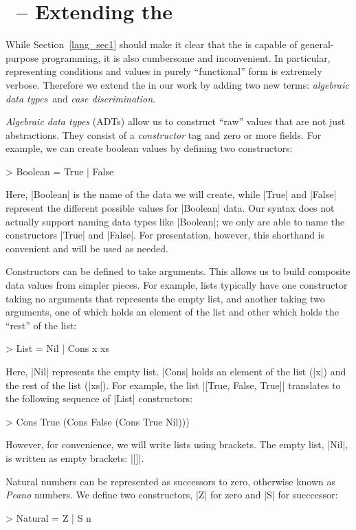 \documentclass[12pt]{report}
\begin{document}
\section{\lamC\ -- Extending the \lamA}
\label{lang_sec4}
While Section~\ref{lang_sec1} should make it clear that the \lamA is
capable of general-purpose programming, it is also cumbersome
and inconvenient. In particular, representing conditions and values in
purely ``functional'' form is extremely verbose. Therefore
we extend the \lamA in our work by adding two new terms: \emph{algebraic
data types}\ and \emph{case discrimination}. 

\emph{Algebraic data types} (ADTs) allow us to construct ``raw'' values that
are not just abstractions. They consist of a \emph{constructor} tag
and zero or more fields. For example, we can create boolean values by
defining two constructors:

> Boolean = True | False

Here, |Boolean| is the name of the data we will create, while |True| and
|False| represent the different possible values for |Boolean| data. Our syntax
does not actually support naming data types like |Boolean|; we only are able
to name the constructors |True| and |False|. For presentation, however, this
shorthand is convenient and will be used as needed.

Constructors can be defined to take arguments. This allows us to build
composite data values from simpler pieces. For example, lists
typically have one constructor taking no arguments that represents the
empty list, and another taking two arguments, one of which holds an
element of the list and other which holds the ``rest'' of the list:

> List = Nil | Cons x xs

Here, |Nil| represents the empty list. |Cons| holds an element of the
list (|x|) and the rest of the list (|xs|). For example, the list
|[True, False, True]| translates to the following sequence of |List|
constructors:

> Cons True (Cons False (Cons True Nil))) 

However, for convenience, we will write lists using brackets. The
empty list, |Nil|, is written as empty brackets: |[]|.

Natural numbers can be represented as successors to zero, otherwise
known as \emph{Peano} numbers. We define two constructors, |Z| for
zero and |S| for succcessor:

> Natural = Z | S n
\end{document}
